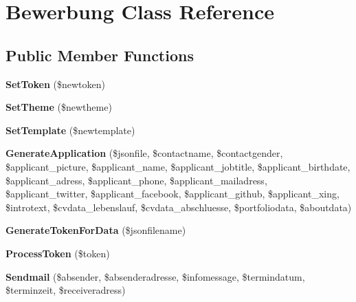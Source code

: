 \hypertarget{class_bewerbung}{\section{Bewerbung Class Reference}
\label{class_bewerbung}
}
\subsection*{Public Member Functions}
\begin{DoxyCompactItemize}
\item 
\hypertarget{class_bewerbung_ac08e3276e59717de394afd5092cc6ab5}{{\bfseries Set\-Token} (\$newtoken)}\label{class_bewerbung_ac08e3276e59717de394afd5092cc6ab5}

\item 
\hypertarget{class_bewerbung_afa68667c76c757b2a208beaad08e102e}{{\bfseries Set\-Theme} (\$newtheme)}\label{class_bewerbung_afa68667c76c757b2a208beaad08e102e}

\item 
\hypertarget{class_bewerbung_ad338bd91a461435af930611c3b77a505}{{\bfseries Set\-Template} (\$newtemplate)}\label{class_bewerbung_ad338bd91a461435af930611c3b77a505}

\item 
\hypertarget{class_bewerbung_a2e715a326cbac492cece751c8e2a52f6}{{\bfseries Generate\-Application} (\$jsonfile, \$contactname, \$contactgender, \$applicant\-\_\-picture, \$applicant\-\_\-name, \$applicant\-\_\-jobtitle, \$applicant\-\_\-birthdate, \$applicant\-\_\-adress, \$applicant\-\_\-phone, \$applicant\-\_\-mailadress, \$applicant\-\_\-twitter, \$applicant\-\_\-facebook, \$applicant\-\_\-github, \$applicant\-\_\-xing, \$introtext, \$cvdata\-\_\-lebenslauf, \$cvdata\-\_\-abschluesse, \$portfoliodata, \$aboutdata)}\label{class_bewerbung_a2e715a326cbac492cece751c8e2a52f6}

\item 
\hypertarget{class_bewerbung_a55dea7aabb5c683f1abc022a921a6032}{{\bfseries Generate\-Token\-For\-Data} (\$jsonfilename)}\label{class_bewerbung_a55dea7aabb5c683f1abc022a921a6032}

\item 
\hypertarget{class_bewerbung_a3939208a63711801c22c5d74c019adfb}{{\bfseries Process\-Token} (\$token)}\label{class_bewerbung_a3939208a63711801c22c5d74c019adfb}

\item 
\hypertarget{class_bewerbung_a9d36c3ba4f6edd1fcb682ae4416251f3}{{\bfseries Sendmail} (\$absender, \$absenderadresse, \$infomessage, \$termindatum, \$terminzeit, \$receiveradress)}\label{class_bewerbung_a9d36c3ba4f6edd1fcb682ae4416251f3}


\end{DoxyCompactItemize}
